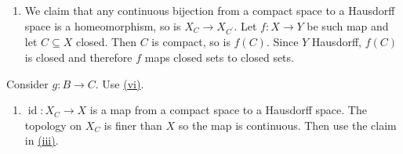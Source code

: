 \begin{exercise}\label{ex3.28}
	\begin{enumerate}
		\item[(iii)] We claim that any continuous bijection from a compact space to a Hausdorff space is a homeomorphism, so is $X_C\rightarrow X_{C^\prime}$. Let $f:X\rightarrow Y$ be such map and let $C\subseteq X$ closed. Then $C$ is compact, so is $f(C)$. Since $Y$ Hausdorff, $f(C)$ is closed and therefore $f$ maps closed sets to closed sets.
	\end{enumerate}
\end{exercise}

\begin{exercise}\label{ex3.29}
	Consider $g:B\rightarrow C$. Use \hyperref[ex1.21]{(vi)}.
\end{exercise}

\begin{exercise}\label{ex3.30}
	\begin{enumerate}
		\item[$\Leftarrow$] $\operatorname{id}:X_C\rightarrow X$ is a map from a compact space to a Hausdorff space. The topology on $X_C$ is finer than $X$ so the map is continuous. Then use the claim in \hyperref[ex3.28]{(iii)}.
	\end{enumerate}
\end{exercise}
